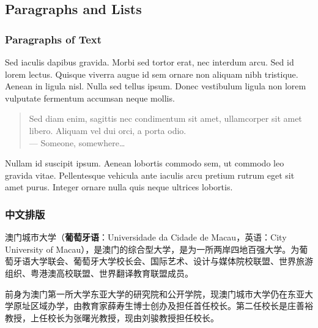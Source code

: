 \documentclass[
	9pt, %
	fontset=none,
]{beamer}
\begin{document}

\subsection{Paragraphs and Lists}

\begin{frame}
	\frametitle{Paragraphs of Text}
	
	Sed iaculis \alert{dapibus gravida}. Morbi sed tortor erat, nec interdum arcu. Sed id lorem lectus. Quisque viverra augue id sem ornare non aliquam nibh tristique. Aenean in ligula nisl. Nulla sed tellus ipsum. Donec vestibulum ligula non lorem vulputate fermentum accumsan neque mollis.
	
	\bigskip %
	
	\begin{quote}
		Sed diam enim, sagittis nec condimentum sit amet, ullamcorper sit amet libero. Aliquam vel dui orci, a porta odio.\\
		--- Someone, somewhere\ldots
	\end{quote}
	
	\bigskip %
	
	Nullam id suscipit ipsum. Aenean lobortis commodo sem, ut commodo leo gravida vitae. Pellentesque vehicula ante iaculis arcu pretium rutrum eget sit amet purus. Integer ornare nulla quis neque ultrices lobortis.
\end{frame}

\begin{frame}
	\frametitle{中文排版}
	澳门城市大学（\textbf{葡萄牙语}：Universidade da Cidade de Macau，英语：City University of Macau），是澳门的综合型大学，是为一所两岸四地百强大学。为葡萄牙语大学联会、葡萄牙大学校长会、国际艺术、设计与媒体院校联盟、世界旅游组织、粤港澳高校联盟、世界翻译教育联盟成员。
	
	\begin{tcolorbox}
		前身为澳门第一所大学东亚大学的研究院和公开学院，现澳门城市大学仍在东亚大学原址区域办学，由教育家薛寿生博士创办及担任首任校长。第二任校长是庄善裕教授，上任校长为张曙光教授，现由刘骏教授担任校长。
	\end{tcolorbox}
\end{frame}
\end{document}
